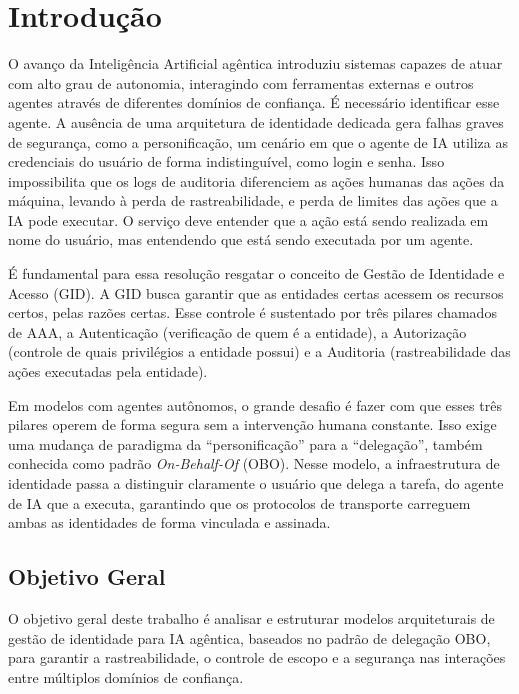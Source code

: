 \documentclass[11pt]{../../modelos-latex/classes/ifscarticle}
\begin{document}
\section{Introdução}
O avanço da Inteligência Artificial agêntica introduziu sistemas capazes de atuar com alto grau de autonomia, interagindo com ferramentas externas e outros agentes através de diferentes domínios de confiança. É necessário identificar esse agente. A ausência de uma arquitetura de identidade dedicada gera falhas graves de segurança, como a personificação, um cenário em que o agente de IA utiliza as credenciais do usuário de forma indistinguível, como login e senha. Isso impossibilita que os logs de auditoria diferenciem as ações humanas das ações da máquina, levando à perda de rastreabilidade, e perda de limites das ações que a IA pode executar. O serviço deve entender que a ação está sendo realizada em nome do usuário, mas entendendo que está sendo executada por um agente.

É fundamental para essa resolução resgatar o conceito de Gestão de Identidade e Acesso (GID). A GID busca garantir que as entidades certas acessem os recursos certos, pelas razões certas. Esse controle é sustentado por três pilares chamados de AAA, a Autenticação (verificação de quem é a entidade), a Autorização (controle de quais privilégios a entidade possui) e a Auditoria (rastreabilidade das ações executadas pela entidade). \cite{melloGestaoIdentidadeAcesso}

Em modelos com agentes autônomos, o grande desafio é fazer com que esses três pilares operem de forma segura sem a intervenção humana constante. Isso exige uma mudança de paradigma da ``personificação'' para a ``delegação'', também conhecida como padrão \textit{On-Behalf-Of} (OBO)\cite{openid-agentic-identity}. Nesse modelo, a infraestrutura de identidade passa a distinguir claramente o usuário que delega a tarefa, do agente de IA que a executa, garantindo que os protocolos de transporte carreguem ambas as identidades de forma vinculada e assinada.

\subsection{Objetivo Geral}
O objetivo geral deste trabalho é analisar e estruturar modelos arquiteturais de gestão de identidade para IA agêntica, baseados no padrão de delegação OBO, para garantir a rastreabilidade, o controle de escopo e a segurança nas interações entre múltiplos domínios de confiança. 
\end{document}
